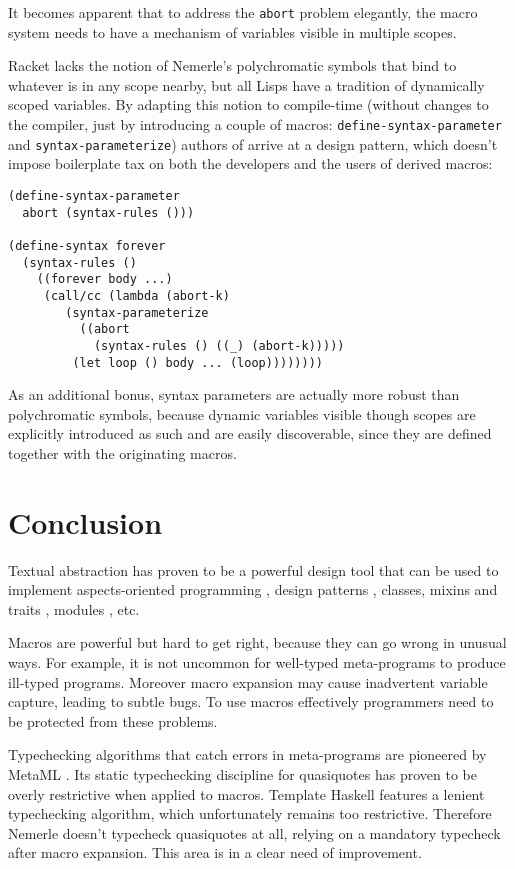 \documentclass[10pt,journal,a4paper]{IEEEtran}
\begin{document}
It becomes apparent that to address the \small \texttt{abort} \normalsize problem elegantly,
the macro system needs to have a mechanism of variables visible in multiple scopes.

Racket lacks the notion
of Nemerle's polychromatic symbols that bind to whatever is in any scope nearby, but all Lisps
have a tradition of dynamically scoped variables. By adapting this notion to compile-time
(without changes to the compiler, just by introducing a couple of macros:
\small \texttt{define-syntax-parameter} \normalsize and \small \texttt{syntax-parameterize}\normalsize)
authors of \cite{barzilay11} arrive at a design pattern, which doesn't impose boilerplate tax
on both the developers and the users of derived macros:

\small
\begin{verbatim}
(define-syntax-parameter
  abort (syntax-rules ()))

(define-syntax forever
  (syntax-rules ()
    ((forever body ...)
     (call/cc (lambda (abort-k)
        (syntax-parameterize
          ((abort
            (syntax-rules () ((_) (abort-k)))))
         (let loop () body ... (loop))))))))
\end{verbatim}
\normalsize

As an additional bonus, syntax parameters are actually more robust than polychromatic symbols,
because dynamic variables visible though scopes are explicitly introduced as such
and are easily discoverable, since they are defined together with the originating macros.

\section{Conclusion}

Textual abstraction has proven to be a powerful design tool that can be used to implement
aspects-oriented programming \cite{skalski04}, design patterns \cite{skalski05},
classes, mixins and traits \cite{flatt06}, modules \cite{flatt10}, etc.

Macros are powerful but hard to get right, because they can go wrong in unusual ways.
For example, it is not uncommon for well-typed meta-programs to produce ill-typed programs.
Moreover macro expansion may cause inadvertent variable capture, leading to
subtle bugs. To use macros effectively programmers need to be protected from these problems.

Typechecking algorithms that catch errors in meta-programs are pioneered by MetaML \cite{taha99}.
Its static typechecking discipline for quasiquotes has proven to be overly restrictive when applied to
macros. Template Haskell features a lenient typechecking algorithm, which unfortunately remains too
restrictive. Therefore Nemerle doesn't typecheck quasiquotes at all, relying on a mandatory typecheck
after macro expansion. This area is in a clear need of improvement.
\end{document}
